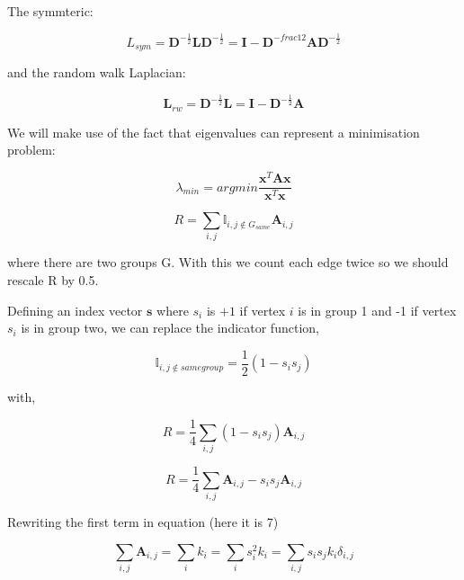 The symmteric:

\begin{equation}
{L}_{sym} = \mathbf{D}^{-\frac{1}{2}}\mathbf{L}\mathbf{D}^{-\frac{1}{2}}= \mathbf{I}-\mathbf{D}^{-frac{1}{2}}\mathbf{A}\mathbf{D}^{-\frac{1}{2}}
\end{equation}

and the random walk Laplacian:

\begin{equation}
\mathbf{L}_{rw}=\mathbf{D}^{-\frac{1}{2}}\mathbf{L}=\mathbf{I}-\mathbf{D}^{-\frac{1}{2}}\mathbf{A}
\end{equation}

We will make use of the fact that eigenvalues can represent a minimisation problem:

\begin{equation}
\lambda_{min}=\mathit{argmin}\frac{\mathbf{x}^T\mathbf{A}\mathbf{x}}{\mathbf{x}^T\mathbf{x}}
\end{equation}


\begin{equation}
R = \sum_{i,j}\mathbb{I}_{i,j\notin G_{same} }\mathbf{A}_{i,j}
\end{equation}

where there are two groups G. With this we count each edge twice so we should rescale R by 0.5.

Defining an index vector $\mathbf{s}$ where $s_i$ is $+1$ if vertex $i$ is in group 1 and -1 if vertex $s_i$ is in group two, we can replace the indicator function,

\begin{equation}
\mathbb{I}_{i,j\notin samegroup}=\frac{1}{2}(1-s_i s_j)
\end{equation}

with,

\begin{equation}
R=\frac{1}{4}\sum_{i,j}(1-s_i s_j)\mathbf{A}_{i,j}
\end{equation}

\begin{equation}
R = \frac{1}{4}\sum_{i,j}\mathbf{A}_{i,j}-s_i s_j \mathbf{A}_{i,j}
\end{equation}

Rewriting the first term in equation (here it is 7)

\begin{equation}
\sum_{i,j}\mathbf{A}_{i,j}=\sum_i k_i = \sum_i s_i ^2 k_i = \sum_{i,j} s_i s_j k_i \delta_{i,j}
\end{equation}

